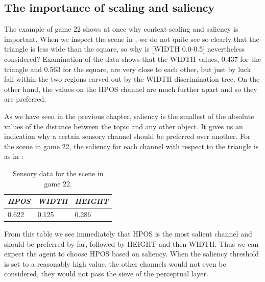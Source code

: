 \subsection{The importance of scaling and saliency}

The example of game 22 shows at once why context-scaling 
and saliency is important. When we inspect the scene in 
, we do not quite see so clearly 
that the triangle is less wide than the square, so why
is [WIDTH 0.0-0.5] 
nevertheless considered? Examination of the data shows
that the WIDTH values, 0.437 for the triangle
and 0.563 for the square, are very close 
to each other, but just by luck fall within 
the two regions carved out by the WIDTH discrimination
tree. On the other hand, the values on the HPOS channel 
are much further apart and so they are preferred. 

As we have seen in the previous chapter, 
saliency is the smallest of the absolute values     
of the distance between the topic and any
other object. It gives us an indication why 
a certain sensory channel should be preferred
over another. For the scene in game 22, the saliency for each channel with 
respect to the triangle is as in : 
\begin{table}
\begin{center}
\begin{tabular}{| l | l | l |} \hline
{\it HPOS} & {\it WIDTH} & {\it HEIGHT} \\ \hline
 0.622 & 0.125 & 0.286  \\ \hline
\end{tabular}
\caption{\label{tab:t-game22-sal} Sensory data for the scene in game 22.}
\end{center}
\end{table}
From this table we see immediately that HPOS is the 
most salient channel and should be preferred by far, followed
by HEIGHT and then WIDTH. Thus we can expect the
agent to choose HPOS based on saliency. When the saliency threshold
is set to a reasonably high value, the other channels
would not even be considered, they would not pass the 
sieve of the perceptual layer. 

